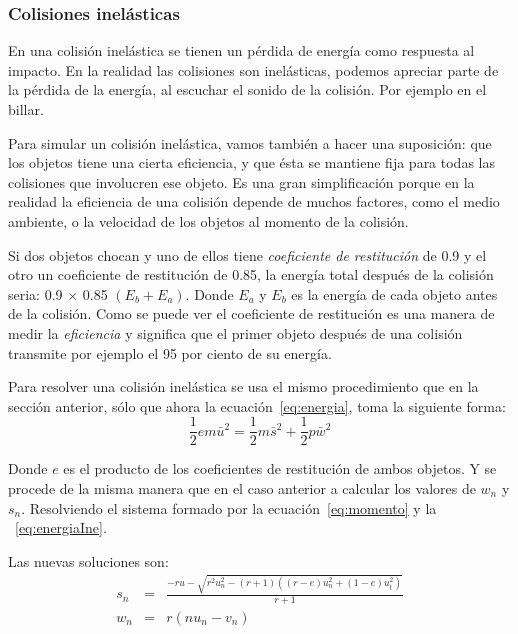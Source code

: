 \subsubsection{Colisiones inelásticas}
En una colisión inelástica se tienen un pérdida de energía como respuesta al impacto. En la realidad las colisiones son inelásticas, podemos apreciar parte de la pérdida de la energía, al escuchar el sonido de la colisión. Por ejemplo en el billar.

Para simular un colisión inelástica, vamos también a hacer una suposición: que los objetos tiene una cierta eficiencia, y que ésta se mantiene fija para todas las colisiones que involucren ese objeto. Es una gran simplificación porque en la realidad la eficiencia de una colisión depende de muchos factores, como el medio ambiente, o la velocidad de los objetos al momento de la colisión.

Si dos objetos chocan y uno de ellos tiene \emph{coeficiente de restitución} de 0.9 y el otro un coeficiente de restitución de 0.85, la energía total después de la colisión seria: 0.9 $\times$ 0.85 $\left(  E_b + E_a\right)$. Donde $E_a$ y $E_b$ es la energía de cada objeto antes de la colisión. Como se puede ver el coeficiente de restitución es una manera de medir la \emph{eficiencia} y significa que el primer objeto después de una colisión transmite por ejemplo el 95 por ciento de su energía.

Para resolver una colisión inelástica se usa el mismo procedimiento que en la sección anterior, sólo que ahora la ecuación~\ref{eq:energia}, toma la siguiente forma:
\begin{equation}
 \frac{1}{2} e m \bar{u}^2 = \frac{1}{2} m \bar{s}^2 + \frac{1}{2} p \bar{w}^2
 \label{eq:energiaIne} 
\end{equation} 

Donde $e$ es el producto de los coeficientes de restitución de ambos objetos. Y se procede de la misma manera que en el caso anterior a calcular los valores de $w_n$ y $s_n$. Resolviendo el sistema formado por la ecuación~\ref{eq:momento} y la ~\ref{eq:energiaIne}.

Las nuevas soluciones son: 
\begin{eqnarray}
s_n & = & \frac{-ru - \sqrt{r^{2} u_{n}^{2} - \left( r + 1\right)  \left( (r - e) u_{n}^{2} + (1 -e) u_{t}^{2} \right) } } { r + 1} \nonumber \\
w_n & = & r \left(  n u_n - v_n \right) \nonumber
\end{eqnarray}

